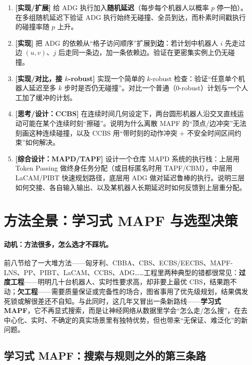 \begin{exercise}
\begin{enumerate}
  \item \textbf{[实现/扩展]} 给 ADG 执行加入\textbf{随机延迟}（每步每个机器人以概率 $p$ 停一拍）。在多组随机延迟下验证 ADG 执行始终无碰撞、全员到达，而朴素时间戳执行的碰撞率随 $p$ 上升。
  \item \textbf{[实现]} 把 ADG 的依赖从“格子访问顺序”扩展到\textbf{边}：若计划中机器人 $i$ 先走过边 $(u,v)$、$j$ 后走同一条边，加一条依赖边。验证在更密集实例上仍无碰撞。
  \item \textbf{[实现/对比，接 $k$-robust]} 实现一个简单的 $k$-robust 检查：验证“任意单个机器人延迟至多 $k$ 步时是否仍无碰撞”。对比一个普通（$0$-robust）计划与一个人工加了缓冲的计划。
  \item \textbf{[思考/设计：CCBS]} 在连续时间几何设定下，两台圆形机器人沿交叉直线运动可能在某个连续时刻“擦碰”。说明为什么离散 MAPF 的“顶点/边冲突”无法刻画这种连续碰撞，以及 CCBS 用“带时刻的动作冲突 $+$ 不安全时间区间约束”如何解决。
  \item \textbf{[综合设计：MAPD/TAPF]} 设计一个仓库 MAPD 系统的执行栈：上层用 Token Passing 做终身任务分配（或目标匿名时用 TAPF/CBM），中层用 LaCAM/PIBT 快速规划路径，底层用 ADG 做对延迟鲁棒的执行。说明三层如何交接、各自输入输出、以及某机器人长期延迟时如何反馈到上层重分配。
\end{enumerate}
\end{exercise}

\section{方法全景：学习式 MAPF 与选型决策}
\label{sec:mapf-landscape}

\paragraph{动机：方法很多，怎么选才不踩坑。}
前八节给了一大堆方法——匈牙利、CBBA、CBS、ECBS/EECBS、MAPF-LNS、PP、PIBT、LaCAM、CCBS、ADG……工程里两种典型的错都很常见：\textbf{过度工程}——明明几十台机器人、实时性要求高，却非要上最优 CBS，结果跑不动；\textbf{欠工程}——需要质量保证或完备性的场合，图省事用了优先级规划，结果偶发死锁或解很差还不自知。与此同时，这几年又冒出一条新路线——\textbf{学习式 MAPF}，它不再显式搜索，而是让神经网络从数据里学会“怎么走/怎么搜”，在去中心化、实时、不确定的真实场景里有独特优势，但也带来“无保证、难泛化”的新问题。

\subsection{学习式 MAPF：搜索与规则之外的第三条路}
\label{sec:mapf-learning}

